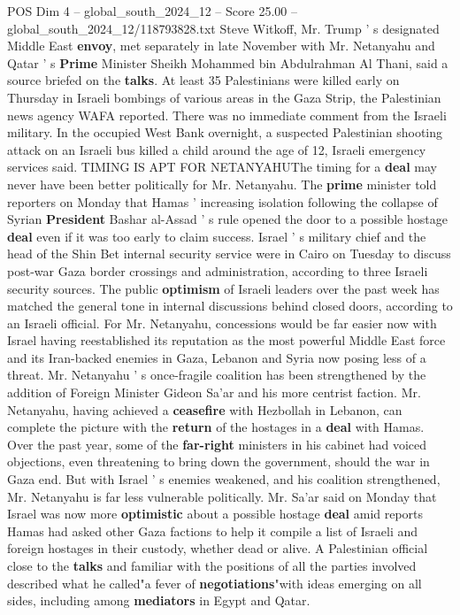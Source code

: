 \begin{textsample}{POS Dim 4 – global\_south\_2024\_12 – Score 25.00 – global\_south\_2024\_12/118793828.txt}
Steve Witkoff, Mr.
Trump ' s designated Middle East \textbf{envoy}, met separately in late November with Mr.
Netanyahu and Qatar ' s \textbf{Prime} Minister Sheikh Mohammed bin Abdulrahman Al Thani, said a source briefed on the \textbf{talks}.
At least 35 Palestinians were killed early on Thursday in Israeli bombings of various areas in the Gaza Strip, the Palestinian news agency WAFA reported.
There was no immediate comment from the Israeli military.
In the occupied West Bank overnight, a suspected Palestinian shooting attack on an Israeli bus killed a child around the age of 12, Israeli emergency services said.
TIMING IS APT FOR NETANYAHUThe timing for a \textbf{deal} may never have been better politically for Mr.
Netanyahu.
The \textbf{prime} minister told reporters on Monday that Hamas ' increasing isolation following the collapse of Syrian \textbf{President} Bashar al-Assad ' s rule opened the door to a possible hostage \textbf{deal} even if it was too early to claim success.
Israel ' s military chief and the head of the Shin Bet internal security service were in Cairo on Tuesday to discuss post-war Gaza border crossings and administration, according to three Israeli security sources.
The public \textbf{optimism} of Israeli leaders over the past week has matched the general tone in internal discussions behind closed doors, according to an Israeli official.
For Mr.
Netanyahu, concessions would be far easier now with Israel having reestablished its reputation as the most powerful Middle East force and its Iran-backed enemies in Gaza, Lebanon and Syria now posing less of a threat.
Mr.
Netanyahu ' s once-fragile coalition has been strengthened by the addition of Foreign Minister Gideon Sa'ar and his more centrist faction.
Mr.
Netanyahu, having achieved a \textbf{ceasefire} with Hezbollah in Lebanon, can complete the picture with the \textbf{return} of the hostages in a \textbf{deal} with Hamas.
Over the past year, some of the \textbf{far-right} ministers in his cabinet had voiced objections, even threatening to bring down the government, should the war in Gaza end.
But with Israel ' s enemies weakened, and his coalition strengthened, Mr.
Netanyahu is far less vulnerable politically.
Mr.
Sa'ar said on Monday that Israel was now more \textbf{optimistic} about a possible hostage \textbf{deal} amid reports Hamas had asked other Gaza factions to help it compile a list of Israeli and foreign hostages in their custody, whether dead or alive.
A Palestinian official close to the \textbf{talks} and familiar with the positions of all the parties involved described what he called"a fever of \textbf{negotiations}"with ideas emerging on all sides, including among \textbf{mediators} in Egypt and Qatar.

\end{textsample}
